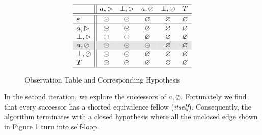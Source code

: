 \documentclass[conference, a4paper]{IEEEtran}
\newcommand{\rblock}[0]{\circleddash}
\newcommand{\rread}[0]{\rhd}
\newcommand{\rnoread}[0]{\oslash}
\newcommand{\rempty}[0]{\varnothing}
\begin{document}
\begin{figure}[ht]
  \begin{center}
    \begin{displaymath}
      \begin{array}{l||ccccc}
        \hline
        & a,\rread & \bot,\rread & a,\rnoread & \bot,\rnoread & T\\
        \hline\hline
        \varepsilon & \rblock & \rblock & \rempty & \rempty & \rempty \\
        \hline
        a,\rread & \rblock & \rblock & \rempty & \rempty & \rempty \\
        \bot,\rread & \rblock & \rblock & \rempty & \rempty & \rempty \\
        \rowcolor[gray]{.9}
        a,\rnoread & \rblock & \rblock & \rblock & \rempty & \rempty \\
        \bot,\rnoread & \rblock & \rblock & \rempty & \rempty & \rempty  \\
        T & \rblock & \rblock & \rempty & \rempty & \rempty \\
        \hline
      \end{array}
    \end{displaymath}
    
  \end{center}
  \caption{Observation Table and Corresponding Hypothesis}
  \label{fig:hypo}
\end{figure}

In the second iteration, we explore the successors of $a,\rnoread$. Fortunately we find that every
successor has a shorted equivalence fellow (\emph{itself}). Consequently, the algorithm terminates
with a closed hypothesis where all the unclosed edge shown in Figure \ref{fig:hypo} turn into
self-loop.
\end{document}
